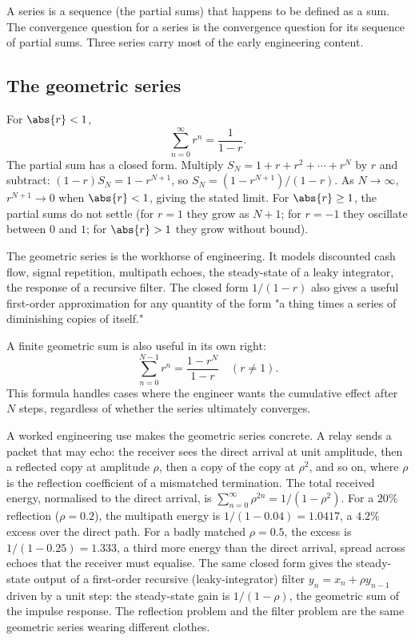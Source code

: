 A series is a sequence (the partial sums) that happens to be defined as
a sum. The convergence question for a series is the convergence question
for its sequence of partial sums. Three series carry most of the early
engineering content.

\subsection{The geometric series}

For $\abs{r} < 1$,
\[
\sum_{n=0}^{\infty} r^{n} = \frac{1}{1 - r}.
\]
The partial sum has a closed form. Multiply $S_{N} = 1 + r + r^{2} +
\cdots + r^{N}$ by $r$ and subtract: $(1 - r) S_{N} = 1 - r^{N+1}$, so
$S_{N} = (1 - r^{N+1}) / (1 - r)$. As $N \to \infty$, $r^{N+1} \to 0$
when $\abs{r} < 1$, giving the stated limit. For $\abs{r} \geq 1$, the
partial sums do not settle (for $r = 1$ they grow as $N + 1$; for
$r = -1$ they oscillate between $0$ and $1$; for $\abs{r} > 1$ they
grow without bound).

The geometric series is the workhorse of engineering. It models
discounted cash flow, signal repetition, multipath echoes, the
steady-state of a leaky integrator, the response of a recursive filter.
The closed form $1/(1 - r)$ also gives a useful first-order
approximation for any quantity of the form "a thing times a series of
diminishing copies of itself."

A finite geometric sum is also useful in its own right:
\[
\sum_{n=0}^{N-1} r^{n} = \frac{1 - r^{N}}{1 - r} \quad (r \neq 1).
\]
This formula handles cases where the engineer wants the cumulative
effect after $N$ steps, regardless of whether the series ultimately
converges.

A worked engineering use makes the geometric series concrete. A
relay sends a packet that may echo: the receiver sees the direct
arrival at unit amplitude, then a reflected copy at amplitude $\rho$,
then a copy of the copy at $\rho^{2}$, and so on, where $\rho$ is the
reflection coefficient of a mismatched termination. The total received
energy, normalised to the direct arrival, is $\sum_{n=0}^{\infty}
\rho^{2n} = 1/(1 - \rho^{2})$. For a $20\%$ reflection ($\rho = 0.2$),
the multipath energy is $1/(1 - 0.04) = 1.0417$, a $4.2\%$ excess over
the direct path. For a badly matched $\rho = 0.5$, the excess is
$1/(1 - 0.25) = 1.333$, a third more energy than the direct arrival,
spread across echoes that the receiver must equalise. The same closed
form gives the steady-state output of a first-order recursive
(leaky-integrator) filter $y_{n} = x_{n} + \rho y_{n-1}$ driven by a
unit step: the steady-state gain is $1/(1 - \rho)$, the geometric sum
of the impulse response. The reflection problem and the filter problem
are the same geometric series wearing different clothes.

